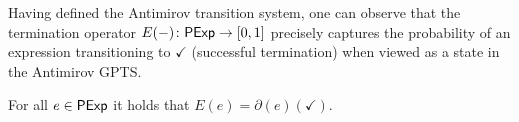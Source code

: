 

Having defined the Antimirov transition system, one can observe that the termination operator $E(-) \colon \mathsf{PExp} \to [0,1]$ precisely captures the probability of an expression transitioning to $\checkmark$ (successful termination) when viewed as a state in the Antimirov {GPTS}.

\begin{lemma}\label{lem:exit_operator_lemma}
    For all $e \in \mathsf{PExp}$ it holds that $E(e)=\partial(e)(\checkmark)$.
    \end{lemma}

